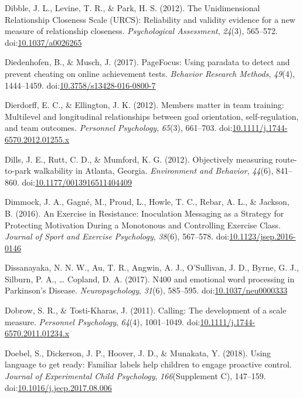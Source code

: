 \documentclass[english,man]{apa6}
\theoremstyle{definition}
\theoremstyle{definition}
\theoremstyle{definition}
\theoremstyle{remark}
\begin{document}
\hypertarget{ref-Dibble2012}{}
Dibble, J. L., Levine, T. R., \& Park, H. S. (2012). The Unidimensional
Relationship Closeness Scale (URCS): Reliability and validity evidence
for a new measure of relationship closeness. \emph{Psychological
Assessment}, \emph{24}(3), 565--572.
doi:\href{https://doi.org/10.1037/a0026265}{10.1037/a0026265}

\hypertarget{ref-Diedenhofen2017}{}
Diedenhofen, B., \& Musch, J. (2017). PageFocus: Using paradata to
detect and prevent cheating on online achievement tests. \emph{Behavior
Research Methods}, \emph{49}(4), 1444--1459.
doi:\href{https://doi.org/10.3758/s13428-016-0800-7}{10.3758/s13428-016-0800-7}

\hypertarget{ref-Dierdorff2012}{}
Dierdorff, E. C., \& Ellington, J. K. (2012). Members matter in team
training: Multilevel and longitudinal relationships between goal
orientation, self-regulation, and team outcomes. \emph{Personnel
Psychology}, \emph{65}(3), 661--703.
doi:\href{https://doi.org/10.1111/j.1744-6570.2012.01255.x}{10.1111/j.1744-6570.2012.01255.x}

\hypertarget{ref-Dills2012}{}
Dills, J. E., Rutt, C. D., \& Mumford, K. G. (2012). Objectively
measuring route-to-park walkability in Atlanta, Georgia.
\emph{Environment and Behavior}, \emph{44}(6), 841--860.
doi:\href{https://doi.org/10.1177/0013916511404409}{10.1177/0013916511404409}

\hypertarget{ref-Dimmock2016}{}
Dimmock, J. A., Gagné, M., Proud, L., Howle, T. C., Rebar, A. L., \&
Jackson, B. (2016). An Exercise in Resistance: Inoculation Messaging as
a Strategy for Protecting Motivation During a Monotonous and Controlling
Exercise Class. \emph{Journal of Sport and Exercise Psychology},
\emph{38}(6), 567--578.
doi:\href{https://doi.org/10.1123/jsep.2016-0146}{10.1123/jsep.2016-0146}

\hypertarget{ref-Dissanayaka2017}{}
Dissanayaka, N. N. W., Au, T. R., Angwin, A. J., O'Sullivan, J. D.,
Byrne, G. J., Silburn, P. A., \ldots{} Copland, D. A. (2017). N400 and
emotional word processing in Parkinson's Disease.
\emph{Neuropsychology}, \emph{31}(6), 585--595.
doi:\href{https://doi.org/10.1037/neu0000333}{10.1037/neu0000333}

\hypertarget{ref-Dobrow2011}{}
Dobrow, S. R., \& Tosti-Kharas, J. (2011). Calling: The development of a
scale measure. \emph{Personnel Psychology}, \emph{64}(4), 1001--1049.
doi:\href{https://doi.org/10.1111/j.1744-6570.2011.01234.x}{10.1111/j.1744-6570.2011.01234.x}

\hypertarget{ref-Doebel2018}{}
Doebel, S., Dickerson, J. P., Hoover, J. D., \& Munakata, Y. (2018).
Using language to get ready: Familiar labels help children to engage
proactive control. \emph{Journal of Experimental Child Psychology},
\emph{166}(Supplement C), 147--159.
doi:\href{https://doi.org/10.1016/j.jecp.2017.08.006}{10.1016/j.jecp.2017.08.006}
\end{document}
